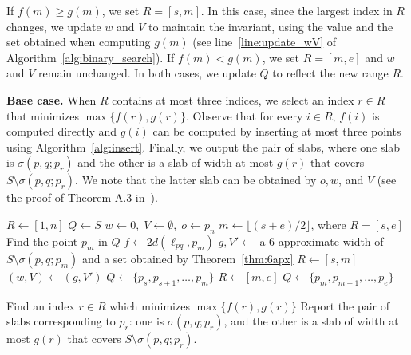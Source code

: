 \documentclass[english,a4paper, cleveref, autoref, thm-restate, nolineno]{socg-lipics-v2021}
\theoremstyle{star}
\theoremstyle{claimstar}
\begin{document}
If $f(m) \ge g(m)$, we set $R = [s, m]$.
In this case, since the largest index in $R$ changes, we update $w$ and $V$ to maintain the invariant, using the value and the set obtained when computing $g(m)$ (see line~\ref{line:update_wV} of Algorithm~\ref{alg:binary_search}).
If $f(m) < g(m)$, we set $R = [m, e]$ and $w$ and $V$ remain unchanged.
In both cases, we update $Q$ to reflect the new range $R$.

\textbf{Base case.} When $R$ contains at most three indices, we select an index $r \in R$ that minimizes $\max \{ f(r), g(r) \}$.
Observe that for every $i\in R$, $f(i)$ is computed directly and $g(i)$ can be computed by inserting at most three points using Algorithm~\ref{alg:insert}. 
Finally, we output the pair of slabs, where one slab is $\sigma(p, q; p_r)$ and the other is a slab of width at most $g(r)$ that covers $S \setminus \sigma(p, q; p_r)$. 
We note that the latter slab can be obtained by $o, w$, and $V$ (see the proof of Theorem A.3 in~\cite{chan2006faster}).



\begin{algorithm}
\caption{A linear-time $10$-approximation algorithm}
\label{alg:binary_search}
\begin{algorithmic}[1]
\State $R \gets [1, n]$
\State $Q \gets S$
\State $w \gets 0, \; V \gets \emptyset, \; o \gets p_n$ 
    \State $m\gets \lfloor (s + e)/2 \rfloor$, where $R = [s, e]$
    \State Find the point $p_{m}$ in $Q$
    \State $f \gets 2d(\ell_{pq}, p_{m})$ \label{line:f}
    \State $g, V' \gets $ a $6$-approximate width of $S\setminus \sigma(p,q;p_{m})$ and a set obtained by Theorem~\ref{thm:6apx}\label{line:g}
     \label{line:bs_condition}
        \State $R \gets [s, m]$ \label{line:if_R}
        \State $(w, V)\gets (g, V')$ \label{line:update_wV}
        \State $Q \gets \{p_{s}, p_{s +1}, \ldots, p_{m} \}$ \label{line:if_Q}
    \Else
        \State $R \gets [m, e]$ \label{line:else_R}
        \State $Q \gets \{p_{m}, p_{m +1}, \ldots, p_{e} \}$ \label{line:else_Q}
        
    \EndIf
\EndWhile

\State Find an index $r\in R$ which minimizes $\max\{f(r), g(r)\}$\label{line:final_index} \label{line:final_R}
\State Report the pair of slabs corresponding to $p_r$: one is $\sigma(p, q; p_r)$, and the other is a slab of width at most $g(r)$ that covers $S \setminus \sigma(p, q; p_r)$.

\end{algorithmic}
\end{algorithm}
\end{document}
